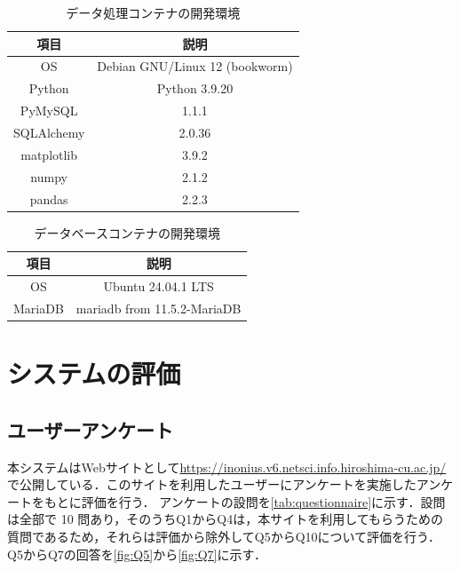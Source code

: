 \begin{table}
    \centering
    \caption{データ処理コンテナの開発環境}
    \label{tab:dataprocessing}
    \begin{tabular}{cc}
        \hline
        項目 & 説明 \\
        \hline \hline
        OS & Debian GNU/Linux 12 (bookworm) \\
        \hline
        Python & Python 3.9.20 \\
        \hline
        PyMySQL & 1.1.1 \\
        \hline
        SQLAlchemy & 2.0.36 \\
        \hline
        matplotlib & 3.9.2 \\
        \hline
        numpy & 2.1.2 \\
        \hline
        pandas & 2.2.3 \\
        \hline
    \end{tabular}
\end{table}

\begin{table}
    \centering
    \caption{データベースコンテナの開発環境}
    \label{tab:database}
    \begin{tabular}{cc}
        \hline
        項目 & 説明 \\
        \hline \hline
        OS & Ubuntu 24.04.1 LTS \\
        \hline
        MariaDB & mariadb from 11.5.2-MariaDB \\
        \hline
        \end{tabular}
\end{table}

\section{システムの評価}
\subsection{ユーザーアンケート}
本システムはWebサイトとして\url{https://inonius.v6.netsci.info.hiroshima-cu.ac.jp/}で公開している．このサイトを利用したユーザーにアンケートを実施したアンケートをもとに評価を行う．
アンケートの設問を\cref{tab:questionnaire}に示す．設問は全部で 10 問あり，そのうちQ1からQ4は，本サイトを利用してもらうための質問であるため，それらは評価から除外してQ5からQ10について評価を行う．
Q5からQ7の回答を\cref{fig:Q5}から\ref{fig:Q7}に示す．

